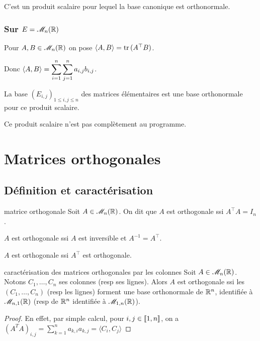 C'est un produit scalaire pour lequel la base canonique est orthonormale.

\subsubsection{Sur \texorpdfstring{$E = \mathscr M_n(\mathbb{R})$}{E = Mn(R)}}

Pour $A, B \in \mathscr M_n(\mathbb{R})$ on pose $\langle A, B \rangle = \operatorname{tr} \,(A^\top B)$.

Donc $\langle A, B \rangle = \displaystyle \sum_{i = 1}^n \sum_{j = 1}^n a_{i,j} b_{i,j}$.

La base $(E_{i,j})_{1 \leqslant i, j \leqslant n}$ des matrices élémentaires est une base orthonormale pour ce produit scalaire.

Ce produit scalaire n'est pas complètement au programme. 

\section{Matrices orthogonales}
\subsection{Définition et caractérisation} 

\begin{definition}{matrice orthogonale}{}
    Soit $A \in \mathscr M_n(\mathbb{R})$. On dit que $A$ est orthogonale ssi $A^\top A = I_n$.
\end{definition}

\begin{remarque}
    $A$ est orthogonale ssi $A$ est inversible et $A^{-1} = A^\top$. 

    $A$ est orthogonale ssi $A^\top$ est orthogonale.
\end{remarque}

\begin{proposition}{caractérisation des matrices orthogonales par les colonnes}{}
    Soit $A \in \mathscr M_n(\mathbb{R})$. Notons $C_1, \dots, C_n$ ses colonnes (resp ses lignes). 
    Alors $A$ est orthogonale ssi les $(C_1, \dots, C_n)$ (resp les lignes) forment une base orthonormale de $\mathbb{R}^n$,
    identifiée à $\mathscr M_{n,1}(\mathbb{R})$ (resp de $\mathbb{R}^n$ identifiée à $\mathscr M_{1,n}(\mathbb{R})$).
\end{proposition}

\begin{proof}
    En effet, par simple calcul, pour $i, j \in [\![1, n]\!]$, on a 
    $(A^TA)_{i, j} = \sum_{k=1}^{n} a_{k, i} a_{k, j} = \langle C_i, C_j \rangle$ 
\end{proof}


